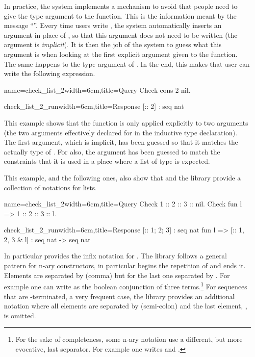 In practice, the \Coq{} system implements a mechanism to avoid that
people need to give the type argument to the  function.  This is
the information meant by the message ``''.  Every time users write , the system automatically
inserts an argument in place of , so that this argument does not
need to be written (the argument is {\em implicit}).  It is then the
job of the \Coq{} system to guess what this argument is when looking at
the first explicit argument given to the function.  The same happens
to the type argument of .  In the end, this makes that user can
write the following expression.

\begin{coq}{name=check_list_2}{width=6cm,title=Query}
Check cons 2 nil.
\end{coq}
\begin{coqout}{check_list_2_run}{width=6cm,title=Response}
[:: 2] : seq nat
\end{coqout}
\index[coq]{\C{(_ :: _)}}
This example shows that the function  is only applied
explicitly to two arguments (the two arguments effectively declared
for  in the inductive type declaration).
The first argument, which is implicit,
has been guessed so that it matches the actually type of .  For 
 also, the argument has been guessed to match the constraints
that it is used in a place where a list of type  is expected.  

This example, and the following ones, also show
that \Coq{} and the \mcbMC{} library provide
a collection of notations for lists.

\begin{coq}{name=check_list_2}{width=6cm,title=Query}
Check 1 :: 2 :: 3 :: nil.
Check fun l => 1 :: 2 :: 3 :: l.
$~$
\end{coq}
\begin{coqout}{check_list_2_run}{width=6cm,title=Response}
[:: 1; 2; 3] : seq nat
fun l => [:: 1, 2, 3 & l]
  : seq nat -> seq nat
\end{coqout}
\index[coq]{\C{[:: .., .., .. & ..]}}

In particular \Coq{} provides the infix notation \C{::} for
.  The \mcbMC{} library follows a general pattern for
n-ary constructors, in particular \C{[::} begins the repetition
of \C{::} and \C{]} ends it.  Elements are separated by \C{,} (comma)
but for the last one separated by \C{&}.
For example one
can write as  the boolean conjunction
of three terms.\footnote{For the sake of completeness, some n-ary notation use a
different, but more evocative, last separator.  For example one writes
\C{[|| b1, b2 | b3]} and \C{[==> b1, b2 => b3]}.}
For sequences that are -terminated, a very frequent case,
the \mcbMC{} library provides an additional notation where all elements are
separated by \C{;} (semi-colon) and the last element, ,
is omitted.

